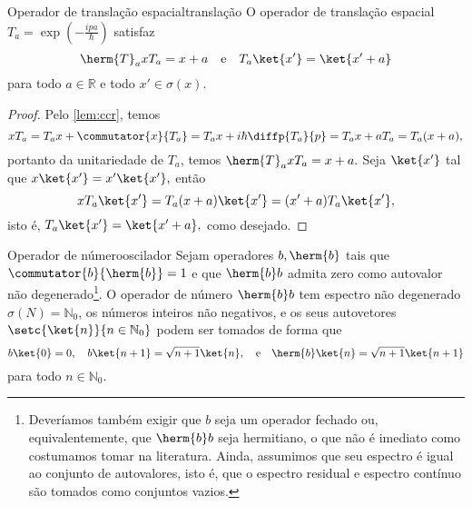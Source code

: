 \begin{lemma}{Operador de translação espacial}{translação}
    O operador de translação espacial \(T_a = \exp\left(- \frac{i p a}{\hbar}\right)\) satisfaz
    \begin{equation*}
        \herm{T}_a x T_a = x + a
        \quad\text{e}\quad
        T_a \ket{x'} = \ket{x' + a}
    \end{equation*}
    para todo \(a \in \mathbb{R}\) e todo \(x' \in \sigma(x)\).
\end{lemma}
\begin{proof}
    Pelo \cref{lem:ccr}, temos
    \begin{equation*}
        x T_a = T_a x + \commutator{x}{T_a} = T_a x + i \hbar \diffp{T_a}{p} = T_a x + a T_a = T_a (x + a),
    \end{equation*}
    portanto da unitariedade de \(T_a\), temos \(\herm{T}_a x T_a = x + a.\) Seja \(\ket{x'}\) tal que \(x \ket{x'} = x' \ket{x'},\) então
    \begin{equation*}
        x T_a \ket{x'} = T_a (x + a) \ket{x'} = (x' + a) T_a \ket{x'},
    \end{equation*}
    isto é, \(T_a \ket{x'} = \ket{x' + a},\) como desejado.
\end{proof}
\begin{lemma}{Operador de número}{oscilador}
    Sejam operadores \(b, \herm{b}\) tais que \(\commutator{b}{\herm{b}} = 1\) e que \(\herm{b}b\) admita zero como autovalor não degenerado\footnote{Deveríamos também exigir que \(b\) seja um operador fechado ou, equivalentemente, que \(\herm{b}b\) seja hermitiano, o que não é imediato como costumamos tomar na literatura. Ainda, assumimos que seu espectro é igual ao conjunto de autovalores, isto é, que o espectro residual e espectro contínuo são tomados como conjuntos vazios.}. O operador de número \(\herm{b}b\) tem espectro não degenerado \(\sigma(N) = \mathbb{N}_0\), os números inteiros não negativos, e os seus autovetores \(\setc{\ket{n}}{n \in \mathbb{N}_0}\) podem ser tomados de forma que
    \begin{equation*}
        b\ket{0} =0,\quad b \ket{n+1} = \sqrt{n+1} \ket{n},\quad\text{e}\quad \herm{b}\ket{n} = \sqrt{n+1} \ket{n+1}
    \end{equation*}
    para todo \(n \in \mathbb{N}_0.\)
\end{lemma}
